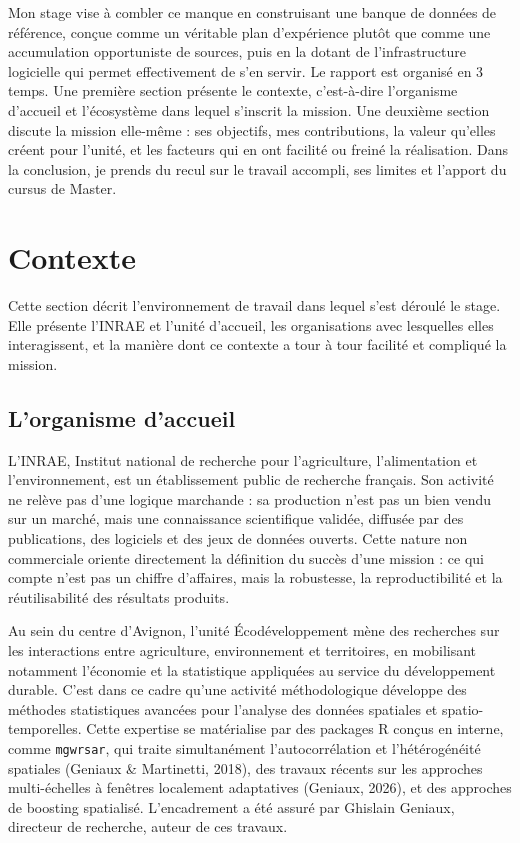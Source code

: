 \documentclass[11pt,a4paper]{article}
\begin{document}
Mon stage vise à combler ce manque en construisant une banque de données de référence, conçue comme un véritable plan d'expérience plutôt que comme une accumulation opportuniste de sources, puis en la dotant de l'infrastructure logicielle qui permet effectivement de s'en servir. Le rapport est organisé en 3 temps. Une première section présente le contexte, c'est-à-dire l'organisme d'accueil et l'écosystème dans lequel s'inscrit la mission. Une deuxième section discute la mission elle-même : ses objectifs, mes contributions, la valeur qu'elles créent pour l'unité, et les facteurs qui en ont facilité ou freiné la réalisation. Dans la conclusion, je prends du recul sur le travail accompli, ses limites et l'apport du cursus de Master.

\section{Contexte}

Cette section décrit l'environnement de travail dans lequel s'est déroulé le stage. Elle présente l'INRAE et l'unité d'accueil, les organisations avec lesquelles elles interagissent, et la manière dont ce contexte a tour à tour facilité et compliqué la mission.

\subsection{L'organisme d'accueil}

L'INRAE, Institut national de recherche pour l'agriculture, l'alimentation et l'environnement, est un établissement public de recherche français. Son activité ne relève pas d'une logique marchande : sa production n'est pas un bien vendu sur un marché, mais une connaissance scientifique validée, diffusée par des publications, des logiciels et des jeux de données ouverts. Cette nature non commerciale oriente directement la définition du succès d'une mission : ce qui compte n'est pas un chiffre d'affaires, mais la robustesse, la reproductibilité et la réutilisabilité des résultats produits.

Au sein du centre d'Avignon, l'unité Écodéveloppement mène des recherches sur les interactions entre agriculture, environnement et territoires, en mobilisant notamment l'économie et la statistique appliquées au service du développement durable. C'est dans ce cadre qu'une activité méthodologique développe des méthodes statistiques avancées pour l'analyse des données spatiales et spatio-temporelles. Cette expertise se matérialise par des packages R conçus en interne, comme \texttt{mgwrsar}, qui traite simultanément l'autocorrélation et l'hétérogénéité spatiales (Geniaux \& Martinetti, 2018), des travaux récents sur les approches multi-échelles à fenêtres localement adaptatives (Geniaux, 2026), et des approches de boosting spatialisé. L'encadrement a été assuré par Ghislain Geniaux, directeur de recherche, auteur de ces travaux.
\end{document}
